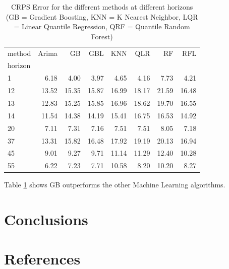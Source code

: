 \documentclass[a4paper,twocolumn,5p]{elsarticle}
\begin{document}
\begin{table}[tbp]
  \centering
  \label{tab:determ}
  \caption{CRPS Error for the different methods at different
    horizons (GB = Gradient Boosting,
    KNN = K Nearest Neighbor,
    LQR = Linear Quantile Regression,
    QRF = Quantile Random Forest)
    }
    \begin{tabular}{lrrrrrrr}
      \toprule
      method &  Arima &    GB &   GBL &   KNN &   QLR &    RF &   RFL \\
      horizon &        &       &       &       &       &       &       \\
      \midrule
      1       &   6.18 &  4.00 &  3.97 &  4.65 &  4.16 &  7.73 &  4.21 \\
      12      &  13.52 & 15.35 & 15.87 & 16.99 & 18.17 & 21.59 & 16.48 \\
      13      &  12.83 & 15.25 & 15.85 & 16.96 & 18.62 & 19.70 & 16.55 \\
      14      &  11.54 & 14.38 & 14.19 & 15.41 & 16.75 & 16.53 & 14.92 \\
      20      &   7.11 &  7.31 &  7.16 &  7.51 &  7.51 &  8.05 &  7.18 \\
      37      &  13.31 & 15.82 & 16.48 & 17.92 & 19.19 & 20.13 & 16.94 \\
      45      &   9.01 &  9.27 &  9.71 & 11.14 & 11.29 & 12.40 & 10.28 \\
      55      &   6.22 &  7.23 &  7.71 & 10.58 &  8.20 & 10.20 &  8.27 \\
      \bottomrule
      \end{tabular}
      
  
\end{table}


Table \ref{tab:determ} shows GB outperforms the other Machine Learning algorithms.


\section{Conclusions}
\label{sec:concl}

\section{References}


\end{document}
